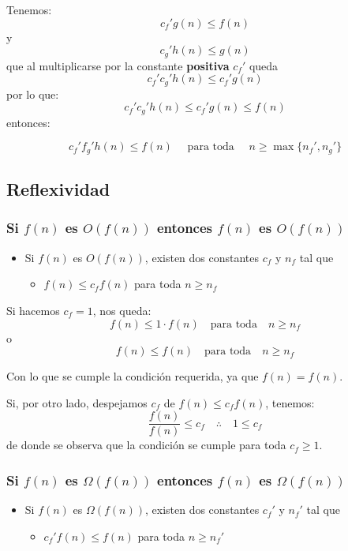 \documentclass[letterpaper]{article}
\begin{document}
Tenemos:
$$
c_f' g(n) \leq f(n)
$$
y
$$
c_g' h(n) \leq g(n)
$$
que al multiplicarse por la constante \textbf{positiva} \(c_f'\) queda
$$
c_f' c_g' h(n) \leq c_f' g(n)
$$
por lo que:
$$
c_f' c_g' h(n) \leq c_f' g(n) \leq f(n)
$$
entonces:

$$
c_f' f_g' h(n) \leq f(n) \quad \mbox{ para toda } \quad n \geq \max\{n_f', n_g'\}
$$
\subsection{Reflexividad}
\label{sec:orgcf4c494}
\subsubsection{Si \(f(n)\) es \(O(f(n))\) entonces \(f(n)\) es \(O(f(n))\)}
\label{sec:org57fdc4b}
\begin{itemize}
\item Si \(f(n)\) es \(O(f(n))\), existen dos constantes \(c_f\) y \(n_f\) tal que
\begin{itemize}
\item \(f(n) \leq c_f f(n)\) para toda \(n \geq n_f\)
\end{itemize}
\end{itemize}

\noindent
Si hacemos \(c_f = 1\), nos queda:
$$
f(n) \leq 1 \cdot f(n) \quad \mbox{para toda} \quad n \geq n_f
$$
o
$$
f(n) \leq f(n) \quad \mbox{para toda} \quad n \geq n_f
$$


\noindent
Con lo que se cumple la condición requerida, ya que \(f(n) = f(n)\).


\noindent
Si, por otro lado, despejamos \(c_f\) de \(f(n) \leq c_f f(n)\), tenemos:
$$
\frac{f(n)}{f(n)} \leq c_f \quad \therefore \quad 1 \leq c_f
$$
de donde se observa que la condición se cumple para toda \(c_f \geq 1\).
\subsubsection{Si \(f(n)\) es \(\Omega(f(n))\) entonces \(f(n)\) es \(\Omega(f(n))\)}
\label{sec:org9cb5b2e}
\begin{itemize}
\item Si \(f(n)\) es \(\Omega(f(n))\), existen dos constantes \(c_f'\) y \(n_f'\) tal que
\begin{itemize}
\item \(c_f' f(n) \leq f(n)\) para toda \(n \geq n_f'\)
\end{itemize}
\end{itemize}
\end{document}
